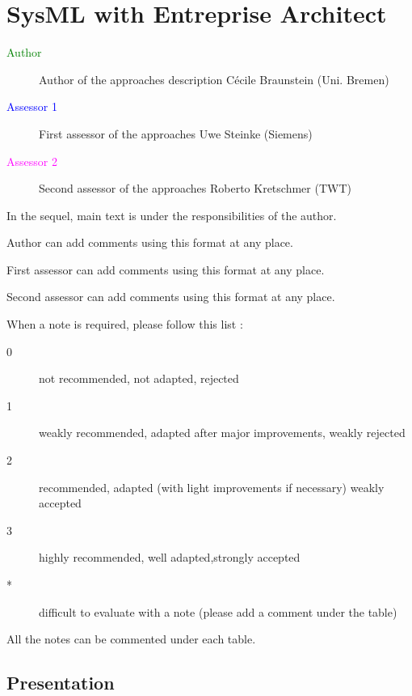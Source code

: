 \chapter{SysML with Entreprise Architect}

\begin{description}
\item[\textcolor{green}{Author}] Author of the approaches description  Cécile Braunstein (Uni. Bremen)
\item[\textcolor{blue}{Assessor 1}] First assessor of the approaches Uwe Steinke (Siemens)
\item[\textcolor{magenta}{Assessor 2}] Second assessor of the approaches Roberto Kretschmer (TWT)
\end{description}

In the sequel, main text is under the responsibilities of the author.

\begin{author_comment}
Author can add comments using this format at any place.
\end{author_comment}

\begin{assessor1}
First assessor can add comments using this format at any place.
\end{assessor1}

\begin{assessor2}
Second assessor can add comments using this format at any place.
\end{assessor2}

When a note is required, please follow this list :
\begin{description}
\item[0] not recommended, not adapted, rejected
\item[1] weakly recommended, adapted after major improvements, weakly rejected
\item[2] recommended, adapted (with light improvements if necessary)  weakly accepted
\item[3] highly recommended, well adapted,strongly accepted
\item[*] difficult to evaluate with a note (please add a comment under the table)
\end{description}

All the notes can be commented under each table.

\section{Presentation}

